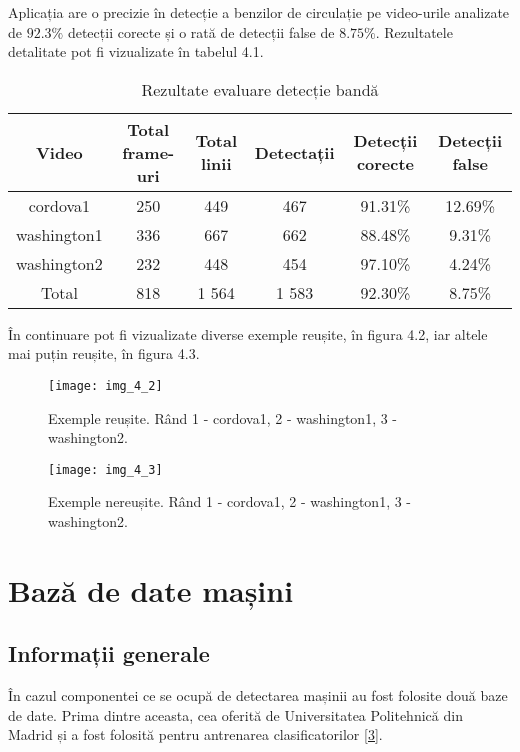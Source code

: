 Aplicația are o precizie în detecție a benzilor de circulație pe video-urile analizate de $92.3\%$ detecții corecte și o rată de detecții false de $8.75\%$. Rezultatele detalitate pot fi vizualizate în tabelul 4.1.

\begin{table}[h!]
	\centering
	\begin{tabular}{||c | c | c | c | c | c ||} 
		\hline
		Video & Total frame-uri & Total linii & Detectații & Detecții corecte & Detecții false \\ [0.5ex] 
		\hline\hline
		cordova1 & 250 & 449 & 467 & 91.31\% & 12.69\%  \\ 
		washington1 & 336 & 667 & 662 & 88.48\% & 9.31\% \\
		washington2 & 232 & 448 & 454 & 97.10\% & 4.24\%  \\ 
		\hline\hline
		Total & 818 & 1 564 & 1 583 & 92.30\% & 8.75\% \\ [1ex]
		 
		\hline
	\end{tabular}
	\caption{Rezultate evaluare detecție bandă}
	\label{table:1}
\end{table}

În continuare pot fi vizualizate diverse exemple reușite, în figura 4.2, iar altele mai puțin reușite, în figura 4.3.

\begin{figure}[!h]
	\centering
	\texttt{[image: img\_4\_2]}
	\caption[Detecție bandă - exemple reușite]{Exemple reușite. Rând 1 - cordova1, 2 - washington1, 3 - washington2.}
\end{figure}
\begin{figure}[!h]
	\centering
	\texttt{[image: img\_4\_3]}
	\caption[Detecție bandă - exemple nereușite]{Exemple nereușite. Rând 1 - cordova1, 2 - washington1, 3 - washington2.}
\end{figure}

\section{Bază de date mașini}

\subsection*{Informații generale}

În cazul componentei ce se ocupă de detectarea mașinii au fost folosite două baze de date. Prima dintre aceasta, cea oferită de Universitatea Politehnică din Madrid și a fost folosită pentru antrenarea clasificatorilor \hyperlink{BazadedatemasiniUniversitateaPolitehnicadinMadrid}{[3]}.

